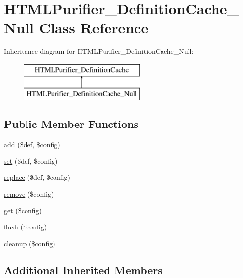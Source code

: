\hypertarget{classHTMLPurifier__DefinitionCache__Null}{\section{H\+T\+M\+L\+Purifier\+\_\+\+Definition\+Cache\+\_\+\+Null Class Reference}
\label{classHTMLPurifier__DefinitionCache__Null}
}
Inheritance diagram for H\+T\+M\+L\+Purifier\+\_\+\+Definition\+Cache\+\_\+\+Null\+:\begin{figure}[H]
\begin{center}
\leavevmode
\includegraphics[height=2.000000cm]{classHTMLPurifier__DefinitionCache__Null}
\end{center}
\end{figure}
\subsection*{Public Member Functions}
\begin{DoxyCompactItemize}
\item 
\hyperlink{classHTMLPurifier__DefinitionCache__Null_aab8dd2f54558eb49a75811eec3c25eaa}{add} (\$def, \$config)
\item 
\hyperlink{classHTMLPurifier__DefinitionCache__Null_a2246600e7504a416ef1b18741b44e16a}{set} (\$def, \$config)
\item 
\hyperlink{classHTMLPurifier__DefinitionCache__Null_ab25d3c12ab8673c423f6ec064b67abbc}{replace} (\$def, \$config)
\item 
\hyperlink{classHTMLPurifier__DefinitionCache__Null_a39f56c8eb7cfaca362d63119f07a0f3a}{remove} (\$config)
\item 
\hyperlink{classHTMLPurifier__DefinitionCache__Null_aa9a03177dbc004b9c7a34c876c754761}{get} (\$config)
\item 
\hyperlink{classHTMLPurifier__DefinitionCache__Null_ac8740961bc97d4576ca4038338d0ef8b}{flush} (\$config)
\item 
\hyperlink{classHTMLPurifier__DefinitionCache__Null_a475e7e47af293abc8bbeb379912cc20c}{cleanup} (\$config)
\end{DoxyCompactItemize}
\subsection*{Additional Inherited Members}



